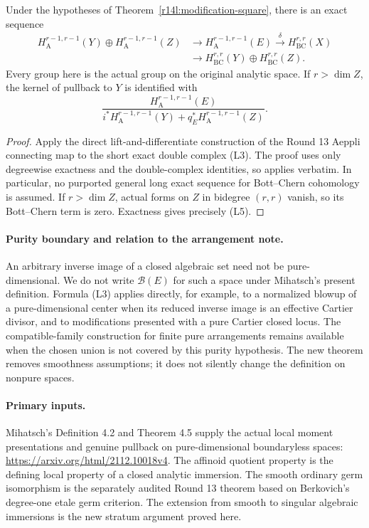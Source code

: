 \begin{corollary}
\label{r14l:aeppli}
Under the hypotheses of Theorem~\ref{r14l:modification-square},
there is an exact sequence
\[
\begin{split}
H_{\mathrm A}^{r-1,r-1}(Y)\oplus H_{\mathrm A}^{r-1,r-1}(Z)
 &\longrightarrow H_{\mathrm A}^{r-1,r-1}(E)
 \xrightarrow{\ \delta\ }H_{\mathrm{BC}}^{r,r}(X)\\
 &\longrightarrow H_{\mathrm{BC}}^{r,r}(Y)
                       \oplus H_{\mathrm{BC}}^{r,r}(Z).
\end{split}
\tag{L4}\label{r14l:aeppli-sequence}
\]
Every group here is the actual group on the original analytic
space. If $r>\dim Z$, the kernel of pullback to $Y$ is
identified with
\[
\frac{H_{\mathrm A}^{r-1,r-1}(E)}
 {i^*H_{\mathrm A}^{r-1,r-1}(Y)+
                         q_E^*H_{\mathrm A}^{r-1,r-1}(Z)}.
\tag{L5}\label{r14l:obstruction-quotient}
\]
\end{corollary}

\begin{proof}
Apply the direct lift-and-differentiate construction of the
Round 13 Aeppli connecting map to the short exact double
complex (L3). The proof uses only degreewise exactness and the
double-complex identities, so applies verbatim. In particular,
no purported general long exact sequence for Bott--Chern
cohomology is assumed. If $r>\dim Z$, actual forms on $Z$ in
bidegree $(r,r)$ vanish, so its Bott--Chern term is zero.
Exactness gives precisely (L5).
\end{proof}

\paragraph{Purity boundary and relation to the arrangement note.}
An arbitrary inverse image of a closed algebraic set need not
be pure-dimensional. We do not write $\mathcal B(E)$ for such
a space under Mihatsch's present definition. Formula (L3)
applies directly, for example, to a normalized blowup of a
pure-dimensional center when its reduced inverse image is an
effective Cartier divisor, and to modifications presented with
a pure Cartier closed locus. The compatible-family construction
for finite pure arrangements remains available when the chosen
union is not covered by this purity hypothesis. The new theorem
removes smoothness assumptions; it does not silently change the
definition on nonpure spaces.

\paragraph{Primary inputs.}
Mihatsch's Definition 4.2 and Theorem 4.5 supply the actual
local moment presentations and genuine pullback on
pure-dimensional boundaryless spaces:
\url{https://arxiv.org/html/2112.10018v4}.
The affinoid quotient property is the defining local property of
a closed analytic immersion. The smooth ordinary germ
isomorphism is the separately audited Round 13 theorem based on
Berkovich's degree-one etale germ criterion. The extension from
smooth to singular algebraic immersions is the new stratum
argument proved here.
